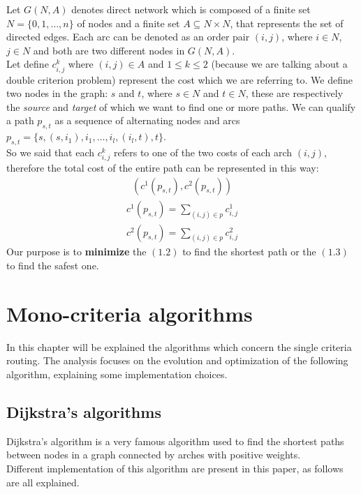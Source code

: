 \documentclass[a4paper,12pt]{report}
\begin{document}
Let $G(N,A)$ denotes direct network which is composed of a finite set $N=\{0,1, \dots, n\}$ of nodes and a finite set $A \subseteq N\times N $, that represents the set of directed edges. Each arc can be denoted as an order pair $(i,j)$, where $i\in N$, $j \in N$ and both are two different nodes in $G(N,A)$.\\
Let define $c^k_{i,j}$ where $(i,j)\in A$ and $1\leq k \leq 2$ (because we are talking about a double criterion problem) represent the cost which we are referring to. We define two nodes in the graph: $s$ and $t$, where $s \in N$ and $t \in N$, these are respectively the \textit{source} and \textit{target} of which we want to find one or more paths.
We can qualify a path $p_{s,t}$ as a sequence  of  alternating nodes and arcs $p_{s,t} = \{s, (s, i_1), i_1, \dots, i_{l}, (i_l,t), t\}$.\\
So we said that each $c^k_{i,j}$ refers to one of the two costs of each arch $(i,j)$, therefore the total cost of the entire path can be represented in this way:\\

\begin{gather}(c^1(p_{s,t}), c^2(p_{s,t}))\end{gather}
\begin{gather}c^1(p_{s,t})=\sum_{(i,j)\in p}c^1_{i,j}\end{gather}
\begin{gather}c^2(p_{s,t})=\sum_{(i,j)\in p}c^2_{i,j}\end{gather}
Our purpose is to \textbf{minimize} the $(1.2)$ to find the shortest path or the $(1.3)$ to find the safest one.

\chapter{Mono-criteria algorithms}

In this chapter will be explained the algorithms which concern the single criteria routing.
The analysis focuses on the evolution and optimization of the following algorithm, explaining some implementation choices.

\section{Dijkstra's algorithms}

Dijkstra's algorithm is a very famous algorithm used to find the shortest paths between nodes in a graph connected by arches with positive weights.\\
Different implementation of this algorithm are present in this paper, as follows are all explained.
\end{document}
